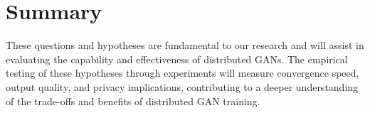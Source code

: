 \section{Summary}
These questions and hypotheses are fundamental to our research and will assist in evaluating the capability and effectiveness of distributed GANs. The empirical testing of these hypotheses through experiments will measure convergence speed, output quality, and privacy implications, contributing to a deeper understanding of the trade-offs and benefits of distributed GAN training.